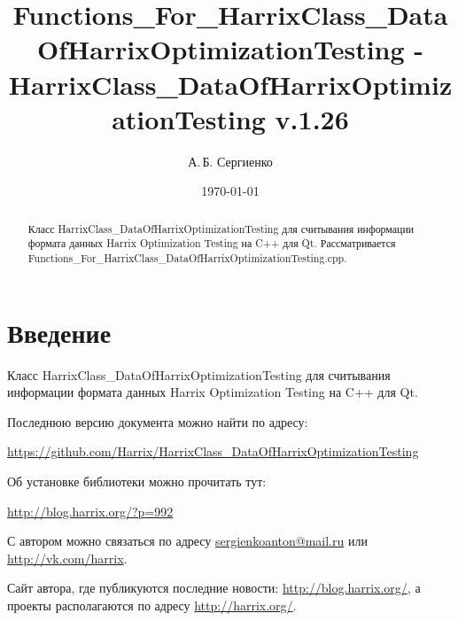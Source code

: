 \documentclass[a4paper,12pt]{article}
\title{Fu\-ncti\-ons\_For\_Har\-rix\-Class\_Da\-ta\-Of\-Har\-rix\-Opt\-im\-iz\-at\-ion\-Tes\-ting - Har\-rix\-Class\_Da\-ta\-Of\-Har\-rix\-Op\-ti\-mi\-za\-tion\-Test\-ing v.1.26}
\author{А.\,Б. Сергиенко}
\date{\today}
\begin{document}


\maketitle

\begin{abstract}
Класс HarrixClass\_DataOfHarrixOptimizationTesting для считывания информации формата данных Harrix Optimization Testing на C++ для Qt. Рассматривается Functions\_For\_HarrixClass\_DataOfHarrixOptimizationTesting.cpp.
\end{abstract}

\tableofcontents

\newpage

\section{Введение}

Класс HarrixClass\_DataOfHarrixOptimizationTesting для считывания информации формата данных Harrix Optimization Testing на C++ для Qt.

Последнюю версию документа можно найти по адресу:

\href{https://github.com/Harrix/HarrixClass\_DataOfHarrixOptimizationTesting}{https://github.com/Harrix/HarrixClass\_DataOfHarrixOptimizationTesting}

Об установке библиотеки можно прочитать тут:

\href{http://blog.harrix.org/?p=992}{http://blog.harrix.org/?p=992}

С автором можно связаться по адресу \href{mailto:sergienkoanton@mail.ru}{sergienkoanton@mail.ru} или  \href{http://vk.com/harrix}{http://vk.com/harrix}.

Сайт автора, где публикуются последние новости: \href{http://blog.harrix.org/}{http://blog.harrix.org/}, а проекты располагаются по адресу \href{http://harrix.org/}{http://harrix.org/}.

\newpage
\end{document}

